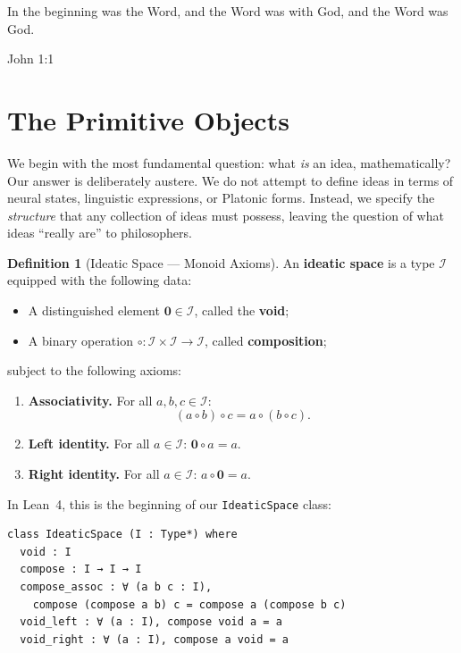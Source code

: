 \documentclass[11pt,openany]{book}
\theoremstyle{definition}
\newtheorem{definition}[axiom]{Definition}
\theoremstyle{plain}
\theoremstyle{remark}
\newcommand{\IS}{\mathcal{I}}               %
\newcommand{\compose}{\circ}                 %
\newcommand{\void}{\mathbf{0}}              %
\begin{document}
\epigraph{In the beginning was the Word, and the Word was with God, and the Word was God.}{John 1:1}

\section{The Primitive Objects}

We begin with the most fundamental question: what \emph{is} an idea, mathematically? Our answer is deliberately austere. We do not attempt to define ideas in terms of neural states, linguistic expressions, or Platonic forms. Instead, we specify the \emph{structure} that any collection of ideas must possess, leaving the question of what ideas ``really are'' to philosophers.

\begin{definition}[Ideatic Space --- Monoid Axioms]
\label{def:ideatic-monoid}
An \textbf{ideatic space} is a type $\IS$ equipped with the following data:
\begin{itemize}
\item A distinguished element $\void \in \IS$, called the \textbf{void};
\item A binary operation $\compose : \IS \times \IS \to \IS$, called \textbf{composition};
\end{itemize}
subject to the following axioms:
\begin{enumerate}
\item[\textbf{(A1)}] \textbf{Associativity.} For all $a, b, c \in \IS$:
\[ (a \compose b) \compose c = a \compose (b \compose c). \]
\item[\textbf{(A2)}] \textbf{Left identity.} For all $a \in \IS$: $\void \compose a = a$.
\item[\textbf{(A3)}] \textbf{Right identity.} For all $a \in \IS$: $a \compose \void = a$.
\end{enumerate}
\end{definition}

In Lean~4, this is the beginning of our \texttt{IdeaticSpace} class:

\begin{lstlisting}
class IdeaticSpace (I : Type*) where
  void : I
  compose : I → I → I
  compose_assoc : ∀ (a b c : I), 
    compose (compose a b) c = compose a (compose b c)
  void_left : ∀ (a : I), compose void a = a
  void_right : ∀ (a : I), compose a void = a
\end{lstlisting}
\end{document}
